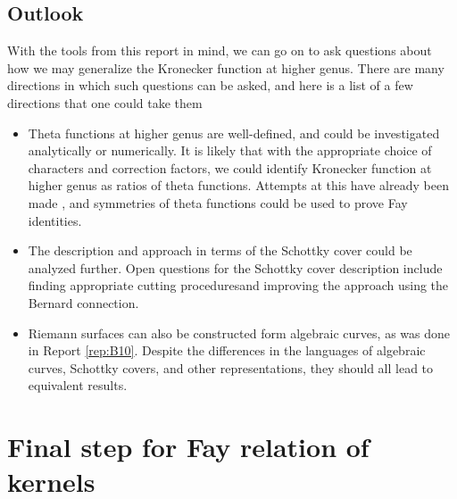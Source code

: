 \section{Outlook}
With the tools from this report in mind, we can go on to ask questions about how we may generalize the Kronecker function at higher genus.
There are many directions in which such questions can be asked, and here is a list of a few directions that one could take them
\begin{itemize}
    \item Theta functions at higher genus are well-defined, and could be investigated analytically or numerically.
    It is likely that with the appropriate choice of characters and correction factors, we could identify Kronecker function at higher genus as ratios of theta functions.
    Attempts at this have already been made \cite{tsuchiya2022formula}, and symmetries of theta functions \cite{Mumford_1994} could be used to prove Fay identities\cite{Mat19}.
    \item The description and approach in terms of the Schottky cover could be analyzed further. Open questions for the Schottky cover description include finding appropriate cutting proceduresand improving the approach using the Bernard connection\cite{Cha22}.
    \item Riemann surfaces can also be constructed form algebraic curves, as was done in Report \ref{rep:B10}. Despite the differences in the languages of algebraic curves, Schottky covers, and other representations, they should all lead to equivalent results.
\end{itemize}




\appendix

\chapter{Final step for Fay relation of kernels}\label{appB12:kernelFay}


